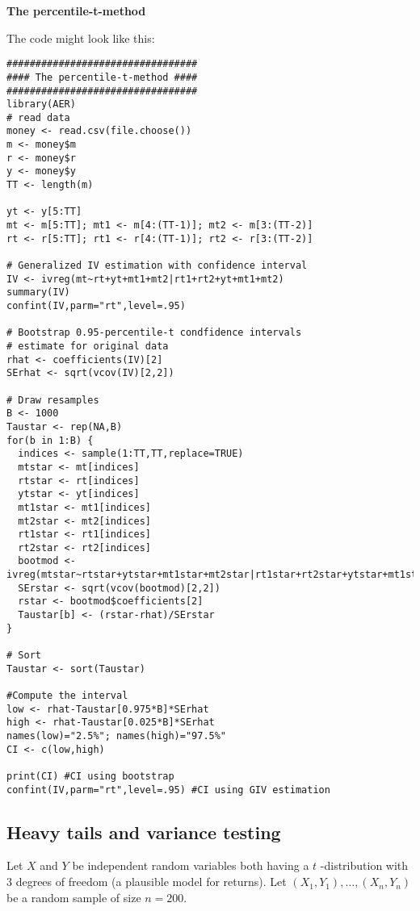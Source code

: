 \documentclass{article}
\begin{document}
\begin{solution}
\textbf{The percentile-t-method }

The code might look like this:
\begin{verbatim}
#################################
#### The percentile-t-method ####
#################################
library(AER)
# read data
money <- read.csv(file.choose())
m <- money$m
r <- money$r
y <- money$y
TT <- length(m)

yt <- y[5:TT]
mt <- m[5:TT]; mt1 <- m[4:(TT-1)]; mt2 <- m[3:(TT-2)]
rt <- r[5:TT]; rt1 <- r[4:(TT-1)]; rt2 <- r[3:(TT-2)]

# Generalized IV estimation with confidence interval
IV <- ivreg(mt~rt+yt+mt1+mt2|rt1+rt2+yt+mt1+mt2)
summary(IV)
confint(IV,parm="rt",level=.95)

# Bootstrap 0.95-percentile-t condfidence intervals
# estimate for original data
rhat <- coefficients(IV)[2]
SErhat <- sqrt(vcov(IV)[2,2])

# Draw resamples
B <- 1000
Taustar <- rep(NA,B)
for(b in 1:B) {
  indices <- sample(1:TT,TT,replace=TRUE)
  mtstar <- mt[indices]
  rtstar <- rt[indices]
  ytstar <- yt[indices]
  mt1star <- mt1[indices]
  mt2star <- mt2[indices]
  rt1star <- rt1[indices]
  rt2star <- rt2[indices]
  bootmod <- ivreg(mtstar~rtstar+ytstar+mt1star+mt2star|rt1star+rt2star+ytstar+mt1star+mt2star)
  SErstar <- sqrt(vcov(bootmod)[2,2])
  rstar <- bootmod$coefficients[2]
  Taustar[b] <- (rstar-rhat)/SErstar
}

# Sort
Taustar <- sort(Taustar)

#Compute the interval
low <- rhat-Taustar[0.975*B]*SErhat
high <- rhat-Taustar[0.025*B]*SErhat
names(low)="2.5%"; names(high)="97.5%"
CI <- c(low,high)

print(CI) #CI using bootstrap
confint(IV,parm="rt",level=.95) #CI using GIV estimation
\end{verbatim}
\end{solution}

\subsection{Heavy tails and variance testing}

Let $X$ and $Y$ be independent random variables both having a $t$%
-distribution with 3 degrees of freedom (a plausible model for returns). Let
$\left( X_{1},Y_{1}\right) ,\ldots ,\left( X_{n},Y_{n}\right) $ be a random
sample of size $n=200$.
\end{document}
